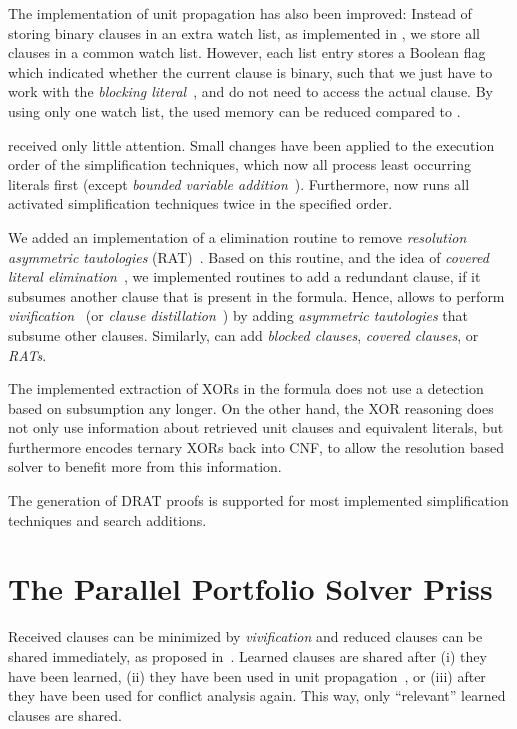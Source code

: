 \documentclass[conference]{IEEEtran}
\begin{document}
The implementation of unit propagation has also been improved: 
Instead of storing binary clauses in an extra watch list, as implemented in \glucose, we store all clauses in a common watch list. 
However, each list entry stores a Boolean flag which indicated whether the current clause is binary, such that we just have to work with the \emph{blocking literal}~\cite{minisat21}, and do not need to access the actual clause. 
By using only one watch list, the used memory can be reduced compared to \glucose.

\coprocessor received only little attention. 
Small changes have been applied to the execution order of the simplification techniques, which now all process least occurring literals first (except \emph{bounded variable addition}~\cite{?}). 
Furthermore, \coprocessor now runs all activated simplification techniques twice in the specified order. 

We added an implementation of a elimination routine to remove \emph{resolution asymmetric tautologies} (RAT)~\cite{?}. 
Based on this routine, and the idea of \emph{covered literal elimination}~\cite{MantheyP:KI:2014}, we implemented routines to add a redundant clause, if it subsumes another clause that is present in the formula. 
Hence, \coprocessor allows to perform \emph{vivification}~\cite{?} (or \emph{clause distillation}~\cite{?}) by adding \emph{asymmetric tautologies} that subsume other clauses. 
Similarly, \coprocessor can add \emph{blocked clauses}, \emph{covered clauses}, or \emph{RATs}. 

The implemented extraction of XORs in the formula does not use a detection based on subsumption any longer. 
On the other hand, the XOR reasoning does not only use information about retrieved unit clauses and equivalent literals, but furthermore encodes ternary XORs back into CNF, to allow the resolution based solver to benefit more from this information. 

The generation of DRAT proofs is supported for most implemented simplification techniques and search additions. 

\section{The Parallel Portfolio Solver Priss}

Received clauses can be minimized by \emph{vivification} and reduced clauses can be shared immediately, as proposed in~\cite{siert}. 
Learned clauses are shared after (i) they have been learned, (ii) they have been used in unit propagation~\cite{glucose4-sat2014}, or (iii) after they have been used for conflict analysis again. 
This way, only ``relevant'' learned clauses are shared. 
\end{document}
